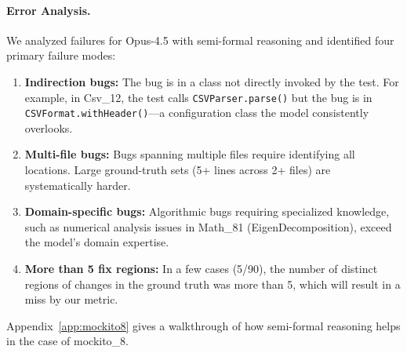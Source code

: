 \documentclass[]{meta}
\newcommand{\satish}[1]{\textcolor{purple}{{\it [SC: #1]}}}
\begin{document}
\paragraph{Error Analysis.}
We analyzed failures for Opus-4.5 with semi-formal reasoning and identified four primary failure modes:
\begin{enumerate}
    \item \textbf{Indirection bugs:} The bug is in a class not directly invoked by the test. For example, in Csv\_12, the test calls \texttt{CSVParser.parse()} but the bug is in \texttt{CSVFormat.withHeader()}---a configuration class the model consistently overlooks.

    \item \textbf{Multi-file bugs:} Bugs spanning multiple files require identifying all locations. Large ground-truth sets (5+ lines across 2+ files) are systematically harder.

    \item \textbf{Domain-specific bugs:} Algorithmic bugs requiring specialized knowledge, such as numerical analysis issues in Math\_81 (EigenDecomposition), exceed the model's domain expertise.

    \item \textbf{More than 5 fix regions:}
    In a few cases (5/90), the number of distinct regions of changes in the ground truth was more than 5, which will result in a miss by our metric.
\end{enumerate}


Appendix~\ref{app:mockito8} gives a walkthrough of how semi-formal reasoning helps in the case of mockito\_8.





\end{document}
